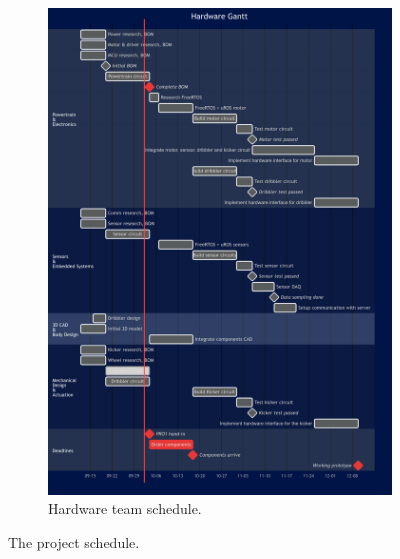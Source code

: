 \begin{figure}[H]
\begin{subfigure}[b]{0.55\textwidth}
       \includegraphics[width=0.95\linewidth]{images/DVA490_hardware_team_project_schedule.png}
       \caption{Hardware team schedule.}
       \label{fig:hardware_schedule}
    \end{subfigure}
    \caption{The project schedule.}
    \label{fig:project_schedule}
\end{figure}




